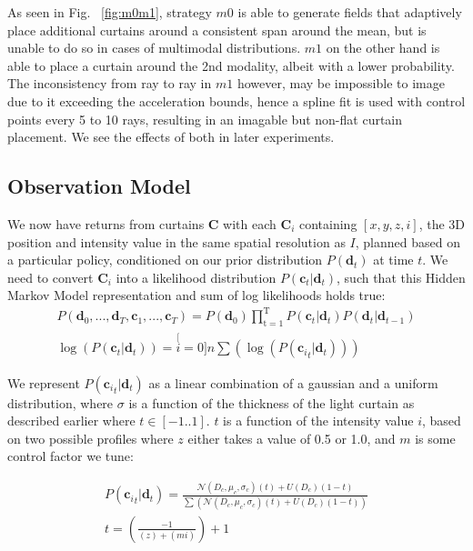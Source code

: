 As seen in Fig. ~\ref{fig:m0m1}, strategy $m0$ is able to generate fields that adaptively place additional curtains around a consistent span around the mean, but is unable to do so in cases of multimodal distributions. $m1$ on the other hand is able to place a curtain around the 2nd modality, albeit with a lower probability. The inconsistency from ray to ray in $m1$ however, may be impossible to image due to it exceeding the acceleration bounds, hence a spline fit is used with control points every 5 to 10 rays, resulting in an imagable but non-flat curtain placement. We see the effects of both in later experiments.

\subsection{Observation Model}

We now have returns from curtains $\mathbf{C}$ with each $\mathbf{C}_{i}$ containing $[x,y,z,i]$, the 3D position and intensity value in the same spatial resolution as $I$, planned based on a particular policy, conditioned on our prior distribution $P(\mathbf{d}_{t})$ at time $t$. We need to convert $\mathbf{C}_{i}$ into a likelihood distribution $P(\mathbf{c}_{t}|\mathbf{d}_{t})$, such that this Hidden Markov Model representation and sum of log likelihoods holds true:
\small
\begin{align}
   P\left(\mathbf{d}_{0},...,\mathbf{d}_{T},\mathbf{c}_{1},...,\mathbf{c}_{T}\right)= 
   P\left(\mathbf{d}_{0}\right)\mathbf{\mathbf{\prod}_{\mathrm{t=1}}^{\mathrm{T}}}P\left(\mathbf{c}_{t}|\mathbf{d}_{t}\right)P\left(\mathbf{d}_{t}|\mathbf{d}_{t-1}\right) \nonumber\\
   \log\left(P\left(\mathbf{c}_{t}|\mathbf{d}_{t}\right)\right)=\stackrel[i=0]{n}{\sum}\left(\log\left(P\left(\mathbf{c_{\mathit{i}}}_{t}|\mathbf{d}_{t}\right)\right)\right)
   \label{eq:hmm}
\end{align}
\normalsize

We represent $P\left(\mathbf{c_{\mathit{i}}}_{t}|\mathbf{d}_{t}\right)$ as a linear combination of a gaussian and a uniform distribution, where $\sigma$ is a function of the thickness of the light curtain as described earlier where $t\in[-1..1]$. $t$ is a function of the intensity value $i$, based on two possible profiles where $z$ either takes a value of 0.5 or 1.0, and $m$ is some control factor we tune:

\small
\begin{align}
   P\left(\mathbf{c_{\mathit{i}}}_{t}|\mathbf{d}_{t}\right)=\frac{\mathcal{N}\left(D_{c},\mu_{c},\sigma_{c}\right)\left(t\right)+U\left(D_{c}\right)(1-t)}{\sum\left(\mathcal{N}\left(D_{c},\mu_{c},\sigma_{c}\right)\left(t\right)+U\left(D_{c}\right)(1-t)\right)} \\
   t=\left(\frac{-1}{\left(z\right)+\left(mi\right)}\right)+1
   \label{eq:dist}
\end{align}
\normalsize

